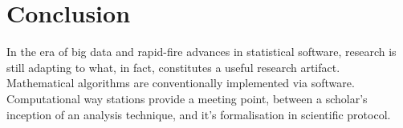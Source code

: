 \documentclass[12pt]{article}\usepackage[]{graphicx}\usepackage[]{color}
\begin{document}
\section{Conclusion}

In the era of big data and rapid-fire advances in statistical software, research is still adapting to what, in fact, constitutes a useful research artifact. Mathematical algorithms are conventionally implemented via software. Computational way stations provide a meeting point, between a scholar's inception of an analysis technique, and it's formalisation in scientific protocol.




\end{document}
